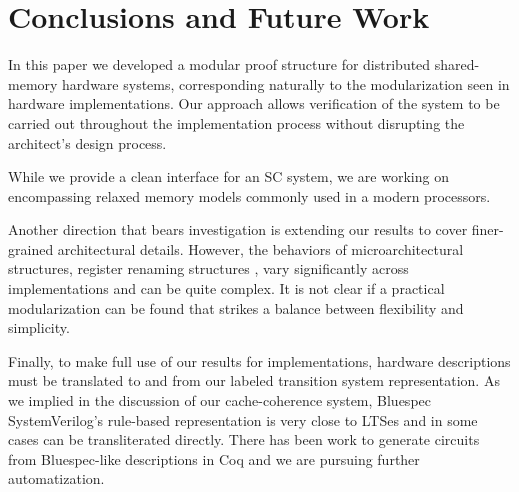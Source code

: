 \section{Conclusions and Future Work}\label{sec:conclusion}

In this paper we developed a modular proof structure for distributed
shared-memory hardware systems, corresponding naturally to the modularization seen in
hardware implementations. Our approach allows verification of the
system to be carried out throughout the implementation process without
disrupting the architect's design process.

While we provide a clean interface for an SC system, we are working on
encompassing relaxed memory models commonly used in a modern processors.

Another direction that bears investigation is extending our results to
cover finer-grained architectural details.
However, the behaviors of microarchitectural structures,
\ie{} register renaming structures \etc{}, vary significantly across
implementations and can be quite complex. It is not clear if a
practical modularization can be found that strikes a balance between flexibility and
simplicity.

Finally, to make full use of our results for implementations, hardware
descriptions must be translated to and from our labeled transition system
representation. As we implied in the discussion of our cache-coherence system,
Bluespec SystemVerilog's rule-based representation is very close to LTSes and
in some cases can be transliterated directly.  There has been work to generate
circuits from Bluespec-like descriptions in Coq \cite{Braibant2013Fesi} and we
are pursuing further automatization.
